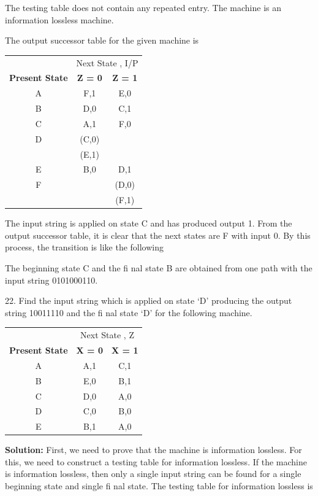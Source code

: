 \documentclass{book}
\begin{document}
The testing table does not contain any repeated entry. The machine is an information lossless machine.

 The output successor table for the given machine is
 
 \begin{center}
 	\begin{tabular}{ccc}
 		\hline
 		& \multicolumn{2}{c}{Next State , I/P}\\
 		\cline{2-3}
 		\textbf{Present State} & \textbf{Z = 0} & \textbf{Z = 1}\\
 		\hline
 		A & F,1 & E,0\\
 		B & D,0 & C,1\\
 		C & A,1 & F,0\\
 		D & (C,0)\\
 		 & (E,1)\\
 		E & B,0 & D,1\\
 		F & & (D,0)\\
 		& & (F,1)\\
 		\hline
 		\end{tabular}
 \end{center}

The input string is applied on state C and has produced output 1. From the output successor table, it is clear that the next states are F with input 0. By this process, the transition is like the following


The beginning state C and the ﬁ nal state B are obtained from one path with the input string 0101000110. 

22. Find the input string which is applied on state ‘D’ producing the output string 10011110 and the ﬁ nal state ‘D’ for the following machine.

\begin{center}
	\begin{tabular}{ccc}
		\hline
		& \multicolumn{2}{c}{Next State , Z}\\
		\cline{2-3}
		\textbf{Present State} & \textbf{X = 0} & \textbf{X = 1}\\
		\hline
		A & A,1 & C,1\\
		B & E,0 & B,1\\
		C & D,0 & A,0\\
		D & C,0 & B,0\\
		E & B,1 & A,0\\
		\hline
	\end{tabular}
\end{center}

\textbf{Solution:} First, we need to prove that the machine is information lossless. For this, we need to construct a testing table for information lossless. If the machine is information lossless, then only a single input string can be found for a single beginning state and single ﬁ nal state. The testing table for information lossless is
\end{document}
